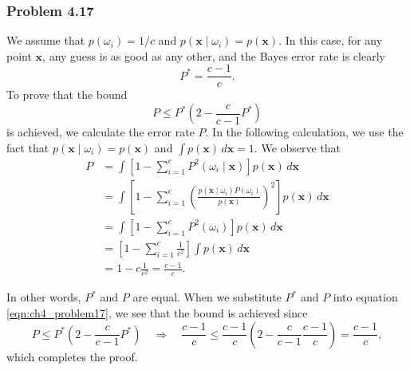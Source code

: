 \documentclass[12pt, a4paper]{article}
\newcommand{\vect}[1]{\bm{#1}}
\begin{document}
\subsubsection*{Problem 4.17}
We assume that $p(\omega_i) = 1/ c$ and $p(\vect{x} \mid \omega_i) = p(\vect{x})$.
In this case, for any point $\vect{x}$, any guess is as good as any other, and the Bayes error rate is clearly
\begin{equation*}
	P^* = \frac{c-1}{c}.
\end{equation*}
To prove that the bound
\begin{equation}
\label{eqn:ch4_problem17}
	P \leq P^* \left( 2 - \frac{c}{c - 1}P^* \right)
\end{equation}
is achieved, we calculate the error rate $P$.
In the following calculation, we use the fact that $p(\vect{x} \mid \omega_i) = p(\vect{x})$ and $\int p( \vect{x}) \, d\vect{x} = 1$.
We observe that
\begin{align*}
	P &= \int \left[ 1 - \sum_{i=1}^{c} P^2 \left( \omega_i \mid \vect{x} \right) \right] p( \vect{x}) \, d\vect{x} \\
	&= \int \left[ 1 - \sum_{i=1}^{c}  \left( \frac{p(\vect{x} \mid \omega_i) P( \omega_i) }{p(\vect{x})} \right)^2 \right] p( \vect{x}) \, d\vect{x} \\
	&= \int \left[ 1 - \sum_{i=1}^{c} P^2( \omega_i) \right] p( \vect{x}) \, d\vect{x} \\
	&= \left[ 1 - \sum_{i=1}^{c} \frac{1}{c^2} \right]  \int  p( \vect{x}) \, d\vect{x} \\
	&= 1 - c \frac{1}{c^2} = \frac{c-1}{c}.
\end{align*}

In other words, $P^*$ and $P$ are equal. 
When we substitute $P^*$ and $P$ into equation \eqref{eqn:ch4_problem17}, we see that the bound is achieved since 
\begin{equation*}
	P \leq P^* \left( 2 - \frac{c}{c - 1}P^* \right) 
	\quad  \Rightarrow \quad
	\frac{c-1}{c} \leq \frac{c-1}{c} \left( 2 - \frac{c}{c-1} \frac{c-1}{c}  \right) = \frac{c-1}{c},
\end{equation*}
which completes the proof.
\end{document}
